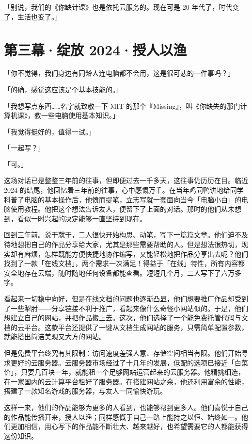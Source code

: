 「别说，我们的《你缺计课》也是依托云服务的。现在可是 20 年代了，时代变了，生活也变了。」

\section{第三幕·绽放 2024·授人以渔}

「你不觉得，我们身边有同龄人连电脑都不会用，这是很可悲的一件事吗？」

「的确，感觉这应该是个基本技能的。」

「我想写点东西……名字就致敬一下 MIT 的那个『Missing』，叫《你缺失的那门计算机课》，教一些电脑使用基本知识。」

「我觉得挺好的，值得一试。」

「一起写？」

「可。」

这场对话已是整整三年前的往事，但即便过去一千多天，这往事仍历历在目。临近 2024 的结尾，他回忆着三年前的往事，心中感慨万千。在当年鸡同鸭讲地给同学科普了电脑的基本操作后，他愤而提笔，立志写就一套面向当今「电脑小白」的电脑使用教程。他把这个想法告诉友人，便留下了上面的对话。那时的他们从未想到，看似一时兴起的决定能够一直坚持到现在。

回到三年前。说干就干，二人很快开始构思、动笔，写下一篇篇文章。他们迫不及待地想把自己的作品分享给大家，尤其是那些需要帮助的人。但是想法很热切，现实却有麻烦，怎样既能方便快捷地协作编写，又能轻松地把作品分享出去呢？他们找到了一款「在线文档」，两个需求一次满足！得益于「在线」特性，所有内容都安全地存在云端，随时随地任何设备都能查看。短短几个月，二人写下了六万多字。

看起来一切稳中向好，但是在线文档的问题也逐渐凸显，他们想要推广作品却受到了一些掣肘——分享链接不利于推广，看起来像什么奇怪小网站似的。于是，他们想建立自己的网站，并把作品搬上去。这次，他们选择了一个能免费托管代码与文档的云平台。这款平台还提供了一键从文档生成网站的服务，只需简单配置参数，就能搭出简洁美观又大方的网站。

但是免费平台终究有其限制：访问速度差强人意、存储空间相当有限。他们开始寻求更好的云服务器。云服务器市场经过了十几年的发展，低配的选项已接近「白菜价」，只要几百块一年，就能租一个足够网站运营起来的云服务器。他精挑细选，在一家国内的云计算平台租好了服务器。在搭建网站之余，他还利用富余的性能，搭建了一款知名游戏的服务器，与友人一同愉快游玩。

这样一来，他们的作品能够为更多的人看到，也能够帮到更多人。他们喜悦于自己的作品能传播开来，授人以渔；同样感慨于自己一路上能持之以恒、始终如一。他们更加相信，用心写下的作品能不断壮大、越来越好，也希望需要它的人都能获得这份知识。

